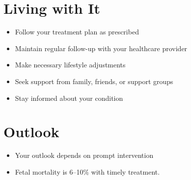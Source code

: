\section{Living with It}
\begin{itemize}[noitemsep]
  \item Follow your treatment plan as prescribed
  \item Maintain regular follow-up with your healthcare provider
  \item Make necessary lifestyle adjustments
  \item Seek support from family, friends, or support groups
  \item Stay informed about your condition
\end{itemize}
\section{Outlook}
\begin{itemize}[noitemsep]
  \item Your outlook depends on prompt intervention
  \item Fetal mortality is 6--10\% with timely treatment.
\end{itemize}
